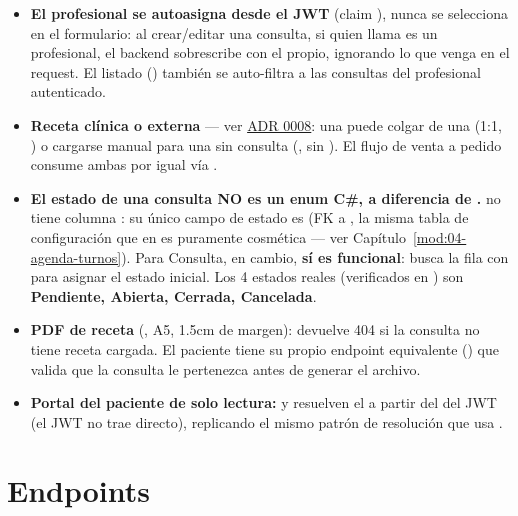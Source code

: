\begin{itemize}
  \item \textbf{El profesional se autoasigna desde el JWT} (claim ), nunca se selecciona en el formulario: al crear/editar una consulta, si quien llama es un profesional, el backend sobrescribe  con el propio, ignorando lo que venga en el request. El listado () también se auto-filtra a las consultas del profesional autenticado.
  \item \textbf{Receta clínica o externa} --- ver \hyperref[adr:0008]{ADR 0008}: una  puede colgar de una  (1:1, ) o cargarse manual para una  sin consulta (, sin ). El flujo de venta a pedido consume ambas por igual vía .
  \item \textbf{El estado de una consulta NO es un enum C\#, a diferencia de .}  no tiene columna : su único campo de estado es  (FK a , la misma tabla de configuración que en  es puramente cosmética --- ver Capítulo~\ref{mod:04-agenda-turnos}). Para Consulta, en cambio,  \textbf{sí es funcional}: \allowbreak {} busca la fila con  para asignar el estado inicial. Los 4 estados reales (verificados en \allowbreak {}) son \textbf{Pendiente, Abierta, Cerrada, Cancelada}.
  \item \textbf{PDF de receta} (, A5, 1.5cm de margen):  devuelve 404 si la consulta no tiene receta cargada. El paciente tiene su propio endpoint equivalente () que valida que la consulta le pertenezca antes de generar el archivo.
  \item \textbf{Portal del paciente de solo lectura:}  y  resuelven el  a partir del  del JWT (el JWT no trae  directo), replicando el mismo patrón de resolución que usa .
\end{itemize}

\section{Endpoints}
\label{sec:clinica-endpoints}

